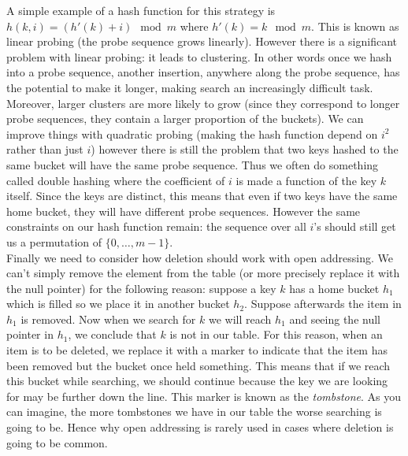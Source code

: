 A simple example of a hash function for this strategy is $h(k, i) = (h'(k) + i) \mod m$ where $h'(k) = k \mod m$. This is known as linear probing (the probe sequence grows linearly). However there is a significant problem with linear probing: it leads to clustering. In other words once we hash into a probe sequence, another insertion, anywhere along the probe sequence, has the potential to make it longer, making search an increasingly difficult task. Moreover, larger clusters are more likely to grow (since they correspond to longer probe sequences, they contain a larger proportion of the buckets). We can improve things with quadratic probing (making the hash function depend on $i^2$ rather than just $i$) however there is still the problem that two keys hashed to the same bucket will have the same probe sequence. Thus we often do something called double hashing where the coefficient of $i$ is made a function of the key $k$ itself. Since the keys are distinct, this means that even if two keys have the same home bucket, they will have different probe sequences. However the same constraints on our hash function remain: the sequence over all $i$'s should still get us a permutation of $\{0, \dots, m - 1\}$.\\

Finally we need to consider how deletion should work with open addressing. We can't simply remove the element from the table (or more precisely replace it with the null pointer) for the following reason: suppose a key $k$ has a home bucket $h_1$ which is filled so we place it in another bucket $h_2$. Suppose afterwards the item in $h_1$ is removed. Now when we search for $k$ we will reach $h_1$ and seeing the null pointer in $h_1$, we conclude that $k$ is not in our table. For this reason, when an item is to be deleted, we replace it with a marker to indicate that the item has been removed but the bucket once held something. This means that if we reach this bucket while searching, we should continue because the key we are looking for may be further down the line. This marker is known as the \textit{tombstone}. As you can imagine, the more tombstones we have in our table the worse searching is going to be. Hence why open addressing is rarely used in cases where deletion is going to be common.